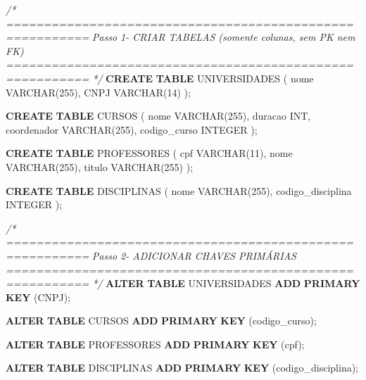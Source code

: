 \documentclass[
]{book}
\newenvironment{Shaded}{\begin{snugshade}}{\end{snugshade}}
\newcommand{\CommentTok}[1]{\textcolor[rgb]{0.56,0.35,0.01}{\textit{#1}}}
\newcommand{\DataTypeTok}[1]{\textcolor[rgb]{0.13,0.29,0.53}{#1}}
\newcommand{\DecValTok}[1]{\textcolor[rgb]{0.00,0.00,0.81}{#1}}
\newcommand{\KeywordTok}[1]{\textcolor[rgb]{0.13,0.29,0.53}{\textbf{#1}}}
\newcommand{\NormalTok}[1]{#1}
\begin{document}
\begin{Shaded}
\begin{Highlighting}[]
\CommentTok{/* =========================================================}
\CommentTok{   Passo 1️{-} CRIAR TABELAS (somente colunas, sem PK nem FK)}
\CommentTok{   ========================================================= */}
\KeywordTok{CREATE} \KeywordTok{TABLE}\NormalTok{ UNIVERSIDADES }
\NormalTok{(}
\NormalTok{    nome            }\DataTypeTok{VARCHAR}\NormalTok{(}\DecValTok{255}\NormalTok{),}
\NormalTok{    CNPJ            }\DataTypeTok{VARCHAR}\NormalTok{(}\DecValTok{14}\NormalTok{)}
\NormalTok{);}

\KeywordTok{CREATE} \KeywordTok{TABLE}\NormalTok{ CURSOS }
\NormalTok{(}
\NormalTok{    nome            }\DataTypeTok{VARCHAR}\NormalTok{(}\DecValTok{255}\NormalTok{),}
\NormalTok{    duracao         }\DataTypeTok{INT}\NormalTok{,}
\NormalTok{    coordenador     }\DataTypeTok{VARCHAR}\NormalTok{(}\DecValTok{255}\NormalTok{),}
\NormalTok{    codigo\_curso    }\DataTypeTok{INTEGER}
\NormalTok{);}

\KeywordTok{CREATE} \KeywordTok{TABLE}\NormalTok{ PROFESSORES }
\NormalTok{(}
\NormalTok{    cpf             }\DataTypeTok{VARCHAR}\NormalTok{(}\DecValTok{11}\NormalTok{),}
\NormalTok{    nome            }\DataTypeTok{VARCHAR}\NormalTok{(}\DecValTok{255}\NormalTok{),}
\NormalTok{    titulo          }\DataTypeTok{VARCHAR}\NormalTok{(}\DecValTok{255}\NormalTok{)}
\NormalTok{);}

\KeywordTok{CREATE} \KeywordTok{TABLE}\NormalTok{ DISCIPLINAS }
\NormalTok{(}
\NormalTok{    nome                }\DataTypeTok{VARCHAR}\NormalTok{(}\DecValTok{255}\NormalTok{),}
\NormalTok{    codigo\_disciplina   }\DataTypeTok{INTEGER}
\NormalTok{);}

\CommentTok{/* =========================================================}
\CommentTok{   Passo 2{-} ADICIONAR CHAVES PRIMÁRIAS}
\CommentTok{   ========================================================= */}
\KeywordTok{ALTER} \KeywordTok{TABLE}\NormalTok{ UNIVERSIDADES }\KeywordTok{ADD} \KeywordTok{PRIMARY} \KeywordTok{KEY}\NormalTok{ (CNPJ);}

\KeywordTok{ALTER} \KeywordTok{TABLE}\NormalTok{ CURSOS        }\KeywordTok{ADD} \KeywordTok{PRIMARY} \KeywordTok{KEY}\NormalTok{ (codigo\_curso);}

\KeywordTok{ALTER} \KeywordTok{TABLE}\NormalTok{ PROFESSORES   }\KeywordTok{ADD} \KeywordTok{PRIMARY} \KeywordTok{KEY}\NormalTok{ (cpf);}

\KeywordTok{ALTER} \KeywordTok{TABLE}\NormalTok{ DISCIPLINAS   }\KeywordTok{ADD} \KeywordTok{PRIMARY} \KeywordTok{KEY}\NormalTok{ (codigo\_disciplina);}


\end{Highlighting}
\end{Shaded}
\end{document}

